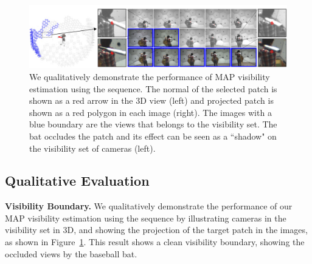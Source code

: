 %

\begin{figure}[th]
	\centering       
	\includegraphics[width=\textwidth]{figures/VisibilityQualitativeFull_small2}
	\caption{We qualitatively demonstrate the performance of MAP visibility estimation using the  sequence. The normal of the selected patch is shown as a red arrow in the 3D view (left) and projected patch is shown as a red polygon in each image (right). The images with a blue boundary are the views that belongs to the visibility set. The bat occludes the patch and its effect can be seen as a ``shadow" on the visibility set of cameras (left).}
	\label{Fig:VisQ}
\end{figure}


\subsection{Qualitative Evaluation}
\noindent \textbf{Visibility Boundary.} We qualitatively demonstrate the performance of our MAP visibility estimation using the  sequence by illustrating cameras in the visibility set in 3D, and showing the projection of the target patch in the images, as shown in Figure~\ref{Fig:VisQ}. This result shows a clean visibility boundary, showing the occluded views by the baseball bat.  

